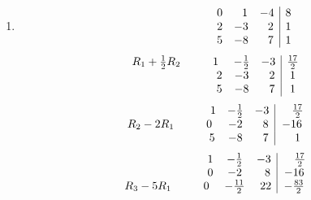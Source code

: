 \documentclass[12pt]{amsart}
\begin{document}
\begin{enumerate}
\begin{enumerate}
			\item
			\begin{align}
				\begin{array}{ccc|c}
					\hspace{2.3cm} \text{ } \text{ } 0&\text{ } \text{ } 1&-4&8 \\
					\hspace{2.3cm} \text{ } \text{ } 2&-3&\text{ } \text{ }2&1 \\
					\hspace{2.3cm} \text{ } \text{ } 5&-8&\text{ } \text{ }7&1
				\end{array} \notag
			\end{align} 
			\smallskip
			\begin{align}
				\begin{array}{ccc|c}
					R_1+\frac{1}{2}R_2 \hspace{1cm} 1&-\frac{1}{2}&-3&\frac{17}{2} \\
					\hspace{2.5cm} \text{ } \text{ } 2&-3&\text{ } \text{ }2&1 \\
					\hspace{2.5cm} \text{ } \text{ } 5&-8&\text{ } \text{ }7&1
				\end{array} \notag
			\end{align} 
			\smallskip
			\begin{align}
				\begin{array}{ccc|c}
					\hspace{2.7cm} 1&-\frac{1}{2}&-3&\text{ } \text{ } \text{ } \frac{17}{2} \\
					R_2-2R_1\hspace{1cm}0&-2&\text{ } \text{ }8&-16 \\
					\hspace{2.4cm} \text{ } \text{ } 5&-8&\text{ } \text{ }7& \text{ } \text{ } \text{ } 1
				\end{array} \notag
			\end{align} 
			\smallskip
			\begin{align}
				\begin{array}{ccc|c}
					\hspace{2.7cm} 1&-\frac{1}{2}&-3&\text{ } \text{ } \text{ } \frac{17}{2} \\
					\hspace{2.7cm}0&-2&\text{ } \text{ }8&-16 \\
					R_3-5R_1\hspace{1cm} 0&-\frac{11}{2}&\text{ }22&-\frac{83}{2}
				\end{array} \notag

\end{align}
\end{enumerate}
\end{enumerate}
\end{document}
